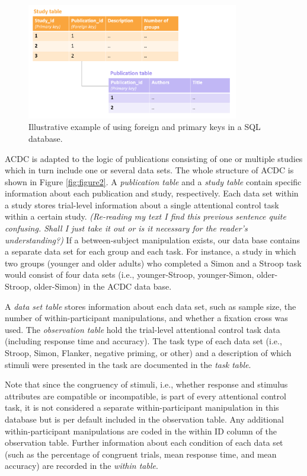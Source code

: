 \documentclass[
  man,floatsintext]{apa6}
\begin{document}
\begin{figure}

{\centering \includegraphics[width=350px]{images/illustrate_SQL_keys} 

}

\caption{Illustrative example of using foreign and primary keys in a SQL database.}\label{fig:figure1}
\end{figure}

ACDC is adapted to the logic of publications consisting of one or multiple studies which in turn include one or several data sets. The whole structure of ACDC is shown in Figure \ref{fig:figure2}. A \emph{publication table} and a \emph{study table} contain specific information about each publication and study, respectively. Each data set within a study stores trial-level information about a single attentional control task within a certain study. \emph{ (Re-reading my text I find this previous sentence quite confusing. Shall I just take it out or is it necessary for the reader's understanding?)} If a between-subject manipulation exists, our data base contains a separate data set for each group and each task. For instance, a study in which two groups (younger and older adults) who completed a Simon and a Stroop task would consist of four data sets (i.e., younger-Stroop, younger-Simon, older-Stroop, older-Simon) in the ACDC data base.

A \emph{data set table} stores information about each data set, such as sample size, the number of within-participant manipulations, and whether a fixation cross was used. The \emph{observation table} hold the trial-level attentional control task data (including response time and accuracy). The task type of each data set (i.e., Stroop, Simon, Flanker, negative priming, or other) and a description of which stimuli were presented in the task are documented in the \emph{task table}.

Note that since the congruency of stimuli, i.e., whether response and stimulus attributes are compatible or incompatible, is part of every attentional control task, it is not considered a separate within-participant manipulation in this database but is per default included in the observation table. Any additional within-participant manipulations are coded in the within ID column of the observation table. Further information about each condition of each data set (such as the percentage of congruent trials, mean response time, and mean accuracy) are recorded in the \emph{within table}.
\end{document}
